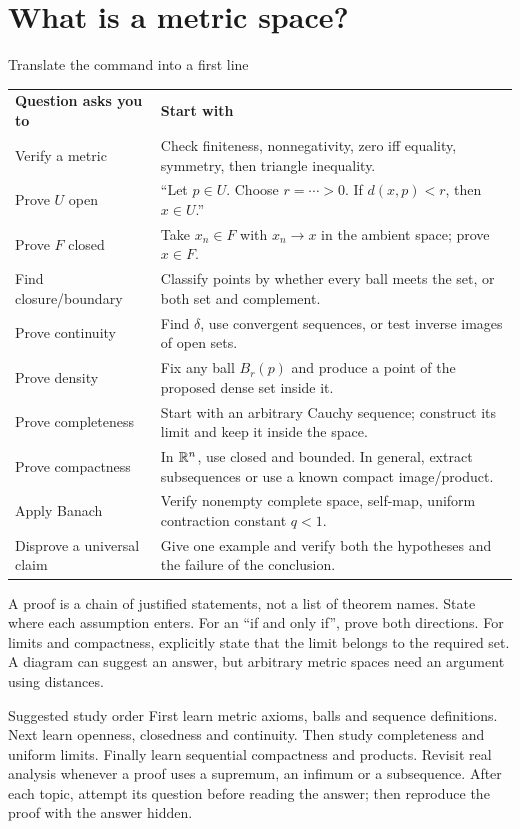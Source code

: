 \clearpage
\setcounter{section}{-1}
\section{What is a metric space?}

\begin{method}{Translate the command into a first line}
\begin{tabular}{p{.32\linewidth}p{.61\linewidth}}
\textbf{Question asks you to}\quad & \textbf{Start with}\rule{0pt}{4ex}\\
Verify a metric & Check finiteness, nonnegativity, zero iff equality, symmetry, then triangle inequality.\\[4pt]
Prove $U$ open & ``Let $p\in U$. Choose $r=\cdots>0$. If $d(x,p)<r$, then $x\in U$.''\\[4pt]
Prove $F$ closed & Take $x_n\in F$ with $x_n\to x$ in the ambient space; prove $x\in F$.\\[4pt]
Find closure/boundary & Classify points by whether every ball meets the set, or both set and complement.\\[4pt]
Prove continuity & Find $\delta$, use convergent sequences, or test inverse images of open sets.\\[4pt]
Prove density & Fix any ball $B_r(p)$ and produce a point of the proposed dense set inside it.\\[4pt]
Prove completeness & Start with an arbitrary Cauchy sequence; construct its limit and keep it inside the space.\\[4pt]
Prove compactness & In $\mathbb R^n$, use closed and bounded. In general, extract subsequences or use a known compact image/product.\\[4pt]
Apply Banach & Verify nonempty complete space, self-map, uniform contraction constant $q<1$.\\[4pt]
Disprove a universal claim & Give one example and verify both the hypotheses and the failure of the conclusion.
\end{tabular}
\end{method}
\begin{tip}
A proof is a chain of justified statements, not a list of theorem names. State where each assumption enters. For an ``if and only if'', prove both directions. For limits and compactness, explicitly state that the limit belongs to the required set. A diagram can suggest an answer, but arbitrary metric spaces need an argument using distances.
\end{tip}
\begin{note}{Suggested study order}
First learn metric axioms, balls and sequence definitions. Next learn openness, closedness and continuity. Then study completeness and uniform limits. Finally learn sequential compactness and products. Revisit real analysis whenever a proof uses a supremum, an infimum or a subsequence. After each topic, attempt its question before reading the answer; then reproduce the proof with the answer hidden.
\end{note}



